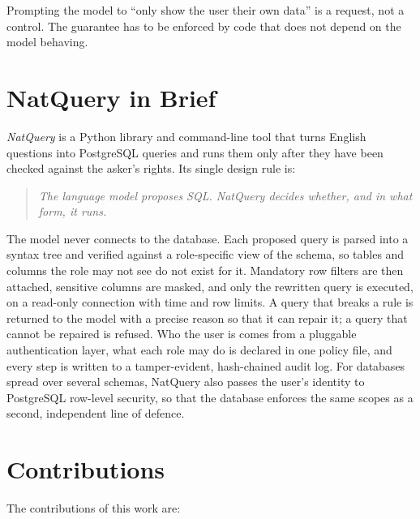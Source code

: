 Prompting the model to ``only show the user their own data'' is a request, not a control. The
guarantee has to be enforced by code that does not depend on the model behaving.

\section{NatQuery in Brief}

\emph{NatQuery} is a Python library and command-line tool that turns English questions into
PostgreSQL queries and runs them only after they have been checked against the asker's rights. Its
single design rule is:

\begin{quote}
\emph{The language model proposes SQL. NatQuery decides whether, and in what form, it runs.}
\end{quote}

The model never connects to the database. Each proposed query is parsed into a syntax tree and
verified against a role-specific view of the schema, so tables and columns the role may not see do
not exist for it. Mandatory row filters are then attached, sensitive columns are masked, and only
the rewritten query is executed, on a read-only connection with time and row limits. A query that
breaks a rule is returned to the model with a precise reason so that it can repair it; a query that
cannot be repaired is refused. Who the user is comes from a pluggable authentication layer, what each
role may do is declared in one policy file, and every step is written to a tamper-evident,
hash-chained audit log. For databases spread over several schemas, NatQuery also passes the user's
identity to PostgreSQL row-level security, so that the database enforces the same scopes as a
second, independent line of defence.

\section{Contributions}

The contributions of this work are:

